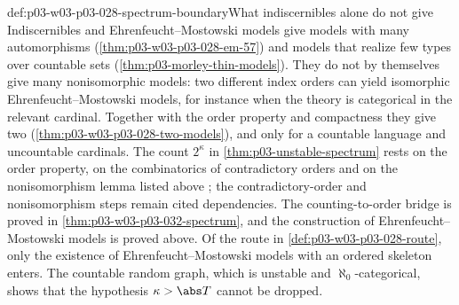 \begin{proofboundary}{def:p03-w03-p03-028-spectrum-boundary}{What indiscernibles alone do not give}
Indiscernibles and Ehrenfeucht--Mostowski models give models with many
automorphisms (\cref{thm:p03-w03-p03-028-em-57}) and models that realize
few types over countable sets (\cref{thm:p03-morley-thin-models}).  They
do not by themselves give many nonisomorphic models: two different index
orders can yield isomorphic Ehrenfeucht--Mostowski models, for instance
when the theory is categorical in the relevant cardinal.  Together with the
order property and compactness they give two
(\cref{thm:p03-w03-p03-028-two-models}), and only for a countable language
and uncountable cardinals.  The count
\(2^\kappa\) in \cref{thm:p03-unstable-spectrum} rests on the order
property, on the combinatorics of contradictory orders and on the
nonisomorphism lemma listed above
\cite[Lemma~1.1, Theorem~2.2, Lemma~4.2]{Shelah1971NonIsomorphicModels};
the contradictory-order and nonisomorphism steps remain cited dependencies.
The counting-to-order bridge is proved in
\cref{thm:p03-w03-p03-032-spectrum}, and the construction of
Ehrenfeucht--Mostowski models is proved above.  Of the route in
\cref{def:p03-w03-p03-028-route}, only the existence of
Ehrenfeucht--Mostowski models with an ordered skeleton enters.  The
countable random graph, which is unstable and \(\aleph_0\)-categorical,
shows that the hypothesis \(\kappa>\abs T\) cannot be dropped.
\end{proofboundary}
